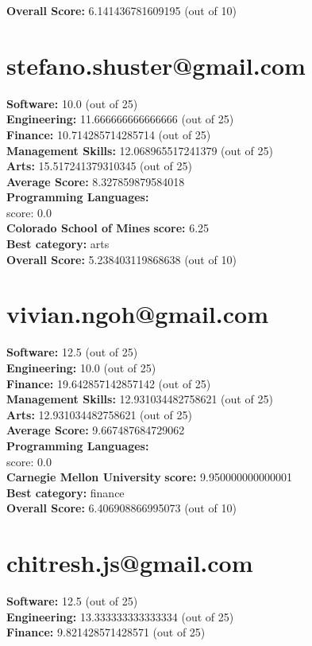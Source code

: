 \documentclass{article}
\begin{document}
\textbf{Overall Score: }6.141436781609195 (out of 10)\section{stefano.shuster@gmail.com}
\textbf{Software:} 10.0 (out of 25)\\
\textbf{Engineering: } 11.666666666666666 (out of 25)\\
\textbf{Finance:} 10.714285714285714 (out of 25)\\
\textbf{Management Skills:} 12.068965517241379 (out of 25)\\
\textbf{Arts:} 15.517241379310345 (out of 25)\\
\textbf{Average Score: } 8.327859879584018\\
\textbf{Programming Languages:} \\
score: 0.0\\
\textbf{Colorado School of Mines} \textbf{score:} 6.25\\
\textbf{Best category: } arts\\
\textbf{Overall Score: }5.238403119868638 (out of 10)\section{vivian.ngoh@gmail.com}
\textbf{Software:} 12.5 (out of 25)\\
\textbf{Engineering: } 10.0 (out of 25)\\
\textbf{Finance:} 19.642857142857142 (out of 25)\\
\textbf{Management Skills:} 12.931034482758621 (out of 25)\\
\textbf{Arts:} 12.931034482758621 (out of 25)\\
\textbf{Average Score: } 9.667487684729062\\
\textbf{Programming Languages:} \\
score: 0.0\\
\textbf{Carnegie Mellon University} \textbf{score:} 9.950000000000001\\
\textbf{Best category: } finance\\
\textbf{Overall Score: }6.406908866995073 (out of 10)\section{chitresh.js@gmail.com}
\textbf{Software:} 12.5 (out of 25)\\
\textbf{Engineering: } 13.333333333333334 (out of 25)\\
\textbf{Finance:} 9.821428571428571 (out of 25)\\
\end{document}

